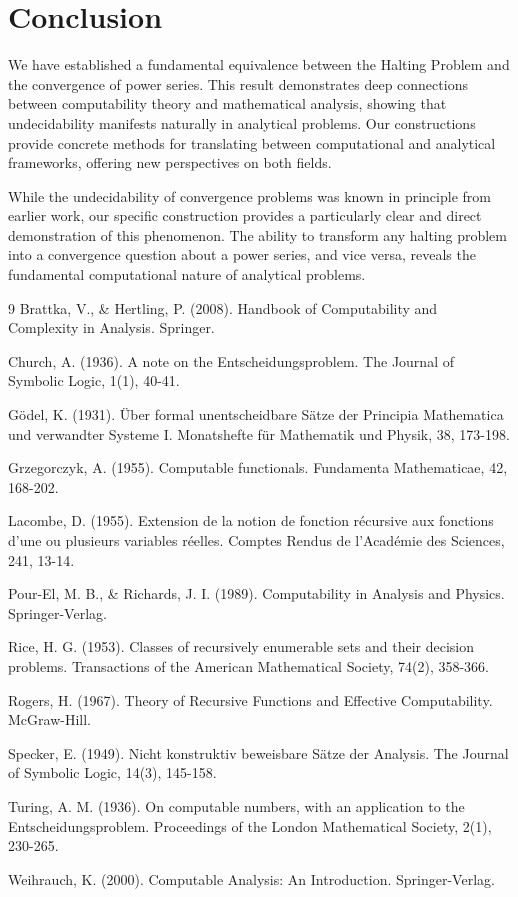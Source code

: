 \documentclass[12pt, a4paper]{article}
\begin{document}
\section{Conclusion}
We have established a fundamental equivalence between the Halting Problem and the convergence of power series. This result demonstrates deep connections between computability theory and mathematical analysis, showing that undecidability manifests naturally in analytical problems. Our constructions provide concrete methods for translating between computational and analytical frameworks, offering new perspectives on both fields.

While the undecidability of convergence problems was known in principle from earlier work, our specific construction provides a particularly clear and direct demonstration of this phenomenon. The ability to transform any halting problem into a convergence question about a power series, and vice versa, reveals the fundamental computational nature of analytical problems.

\begin{thebibliography}{9}
Brattka, V., \& Hertling, P. (2008). Handbook of Computability and Complexity in Analysis. Springer.

Church, A. (1936). A note on the Entscheidungsproblem. The Journal of Symbolic Logic, 1(1), 40-41.

Gödel, K. (1931). Über formal unentscheidbare Sätze der Principia Mathematica und verwandter Systeme I. Monatshefte für Mathematik und Physik, 38, 173-198.

Grzegorczyk, A. (1955). Computable functionals. Fundamenta Mathematicae, 42, 168-202.

Lacombe, D. (1955). Extension de la notion de fonction récursive aux fonctions d'une ou plusieurs variables réelles. Comptes Rendus de l'Académie des Sciences, 241, 13-14.

Pour-El, M. B., \& Richards, J. I. (1989). Computability in Analysis and Physics. Springer-Verlag.

Rice, H. G. (1953). Classes of recursively enumerable sets and their decision problems. Transactions of the American Mathematical Society, 74(2), 358-366.

Rogers, H. (1967). Theory of Recursive Functions and Effective Computability. McGraw-Hill.

Specker, E. (1949). Nicht konstruktiv beweisbare Sätze der Analysis. The Journal of Symbolic Logic, 14(3), 145-158.

Turing, A. M. (1936). On computable numbers, with an application to the Entscheidungsproblem. Proceedings of the London Mathematical Society, 2(1), 230-265.

Weihrauch, K. (2000). Computable Analysis: An Introduction. Springer-Verlag.

\end{thebibliography}
\end{document}
